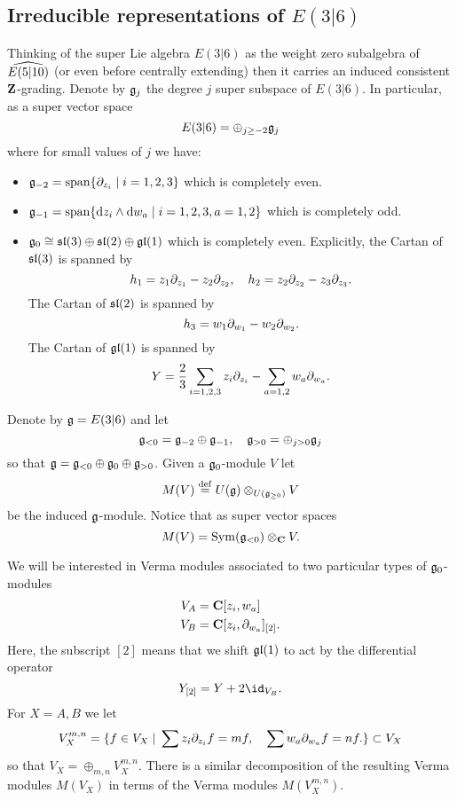 \subsection{Irreducible representations of $E(3|6)$}
Thinking of the super Lie algebra $E(3|6)$ as the weight zero subalgebra of $\Hat{E(5|10)}$ (or even before centrally extending) then it carries an induced consistent $\Z$-grading. 
Denote by $\fg_j$ the degree $j$ super subspace of $E(3|6)$.
In particular, as a super vector space
\[
E(3|6) = \oplus_{j \geq -2} \fg_j
\]
where for small values of $j$ we have:
\begin{itemize}
\item $\fg_{-2} = {\rm span}\{\del_{z_i}\; | \; {i=1,2,3}\}$ which is completely even. 
\item $\fg_{-1} = {\rm span}\{\d z_i \wedge \d w_a \; | \; i=1,2,3, a=1,2\}$ which is completely odd. 
\item $\fg_0 \cong \lie{sl}(3) \oplus \lie{sl}(2) \oplus \lie{gl}(1)$ which is completely even. 
Explicitly, the Cartan of $\lie{sl}(3)$ is spanned by 
\[
h_1 = z_1 \del_{z_1} - z_2 \del_{z_2}, \quad h_2 = z_2 \del_{z_2} - z_3 \del_{z_3} .
\]
The Cartan of $\lie{sl}(2)$ is spanned by
\[
h_3 = w_1 \del_{w_1} - w_2 \del_{w_2} .
\]
The Cartan of $\lie{gl}(1)$ is spanned by
\[
Y = \frac23 \sum_{i=1,2,3} z_i \del_{z_i} - \sum_{a=1,2} w_a \del_{w_a} .
\]
\end{itemize}

\parsec[s:vermas]

Denote by $\fg = E(3|6)$ and let 
\[
\fg_{<0} = \fg_{-2} \oplus \fg_{-1} , \quad \lie{g}_{>0} = \oplus_{j>0} \fg_j 
\]
so that $\fg = \fg_{<0} \oplus \fg_0 \oplus \fg_{>0}$. 
Given a $\fg_0$-module $V$ let 
\[
M (V) \define U(\fg) \otimes_{U(\fg_{\geq 0})} V 
\]
be the induced $\fg$-module. 
Notice that as super vector spaces 
\[
M(V) = \Sym(\fg_{<0}) \otimes_\C V .
\]

We will be interested in Verma modules associated to two particular types of $\fg_0$-modules
\begin{align*}
V_A & = \C[z_i, w_a] \\
V_B & = \C[z_i, \del_{w_a}]_{[2]} .
\end{align*}
Here, the subscript $[2]$ means that we shift $\lie{gl}(1)$ to act by the differential operator 
\[
Y_{[2]} = Y + 2 \id_{V_B} .
\]
For $X = A,B$ we let 
\[
V_X^{m,n} = \{f \in V_X \; | \; \sum z_i \del_{z_i} f = m f , \quad \sum w_a \del_{w_a} f = n f.\} \subset V_X
\]
so that $V_X = \oplus_{m,n} V_X^{m,n}$. 
There is a similar decomposition of the resulting Verma modules $M(V_X)$ in terms of the Verma modules $M(V_{X}^{m,n})$. 

